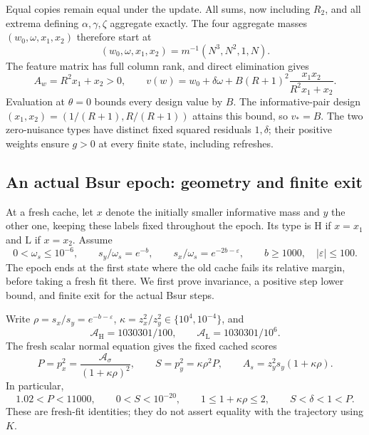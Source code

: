 Equal copies remain equal under the update. All sums, now including $R_2$, and
all extrema defining $\alpha,\gamma,\zeta$ aggregate exactly. The four aggregate
masses $(w_0,\omega,x_1,x_2)$ therefore start at
\[
 (w_0,\omega,x_1,x_2)=m^{-1}(N^3,N^2,1,N).
\]
The feature matrix has full column rank, and direct elimination gives
\begin{equation}\label{eq:bsur-value}
 A_w=R^2x_1+x_2>0,\qquad
 v(w)=w_0+\delta\omega+
 B(R+1)^2\frac{x_1x_2}{R^2x_1+x_2}.
\end{equation}
Evaluation at $\theta=0$ bounds every design value by $B$. The informative-pair
design $(x_1,x_2)=(1/(R+1),R/(R+1))$ attains this bound, so $v_*=B$.
The two zero-nuisance types have distinct fixed squared residuals $1,\delta$;
their positive weights ensure $g>0$ at every finite state, including refreshes.

\subsection{An actual Bsur epoch: geometry and finite exit}
\label{sec:bsur-geometry}

At a fresh cache, let $x$ denote the initially smaller informative mass and $y$
the other one, keeping these labels fixed throughout the epoch. Its type is
$\mathrm H$ if $x=x_1$ and $\mathrm L$ if $x=x_2$. Assume
\begin{equation}\label{eq:bsur-entry}
 0<\omega_s\le10^{-6},\qquad
 s_y/\omega_s=e^{-b},\qquad s_x/\omega_s=e^{-2b-\varepsilon},
 \qquad b\ge1000,\quad |\varepsilon|\le100.
\end{equation}
The epoch ends at the first state where the old cache fails its relative margin,
before taking a fresh fit there. We first prove invariance, a positive step
lower bound, and finite exit for the actual Bsur steps.

Write $\rho=s_x/s_y=e^{-b-\varepsilon}$,
$\kappa=z_x^2/z_y^2\in\{10^4,10^{-4}\}$, and
\[
 \mathcal A_{\mathrm H}=1030301/100,\qquad
 \mathcal A_{\mathrm L}=1030301/10^6.
\]
The fresh scalar normal equation gives the fixed cached scores
\begin{equation}\label{eq:bsur-scores}
 P=p_x^2=\frac{\mathcal A_\sigma}{(1+\kappa\rho)^2},\qquad
 S=p_y^2=\kappa\rho^2P,\qquad
 A_s=z_y^2s_y(1+\kappa\rho).
\end{equation}
In particular,
\[
 1.02<P<11000,\qquad 0<S<10^{-20},\qquad
 1\le1+\kappa\rho\le2,\qquad S<\delta<1<P.
\]
These are fresh-fit identities; they do not assert equality with the trajectory
using $K$.

